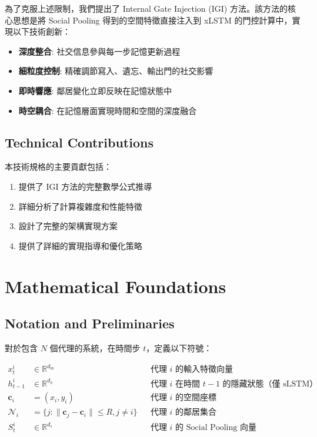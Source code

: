 \documentclass[11pt,a4paper]{article}
\begin{document}
為了克服上述限制，我們提出了 Internal Gate Injection (IGI) 方法。該方法的核心思想是將 Social Pooling 得到的空間特徵直接注入到 xLSTM 的門控計算中，實現以下技術創新：

\begin{itemize}
\item \textbf{深度整合}: 社交信息參與每一步記憶更新過程
\item \textbf{細粒度控制}: 精確調節寫入、遺忘、輸出門的社交影響
\item \textbf{即時響應}: 鄰居變化立即反映在記憶狀態中
\item \textbf{時空耦合}: 在記憶層面實現時間和空間的深度融合
\end{itemize}

\subsection{Technical Contributions}

本技術規格的主要貢獻包括：

\begin{enumerate}
\item 提供了 IGI 方法的完整數學公式推導
\item 詳細分析了計算複雜度和性能特徵
\item 設計了完整的架構實現方案
\item 提供了詳細的實現指導和優化策略
\end{enumerate}

\section{Mathematical Foundations}

\subsection{Notation and Preliminaries}

對於包含 $N$ 個代理的系統，在時間步 $t$，定義以下符號：

\begin{align}
x_t^i &\in \mathbb{R}^{d_{\text{in}}} &&\text{代理 } i \text{ 的輸入特徵向量} \\
h_{t-1}^i &\in \mathbb{R}^{d_h} &&\text{代理 } i \text{ 在時間 } t-1 \text{ 的隱藏狀態（僅 sLSTM）} \\
\mathbf{c}_i &= (x_i, y_i) &&\text{代理 } i \text{ 的空間座標} \\
\mathcal{N}_i &= \{j : \|\mathbf{c}_j - \mathbf{c}_i\| \leq R, j \neq i\} &&\text{代理 } i \text{ 的鄰居集合} \\
S_t^i &\in \mathbb{R}^{d_s} &&\text{代理 } i \text{ 的 Social Pooling 向量}
\end{align}
\end{document}
